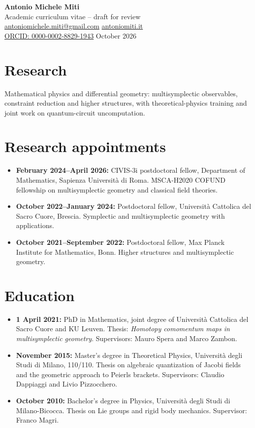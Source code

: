 \documentclass[11pt,a4paper]{article}
\newcommand{\AI}[1]{{\color{red}#1}}
\begin{document}
\begin{center}
{\LARGE\bfseries Antonio Michele Miti}\\[0.2em]
{\large Academic curriculum vitae -- draft for review}\\[0.3em]
\href{mailto:antoniomichele.miti@gmail.com}{antoniomichele.miti@gmail.com}\quad
\href{https://www.antoniomiti.it/}{antoniomiti.it}\\
\href{https://orcid.org/0000-0002-8829-1943}{ORCID: 0000-0002-8829-1943} October 2026
\end{center}
\section*{Research}
\AI{Mathematical physics and differential geometry: multisymplectic observables, constraint reduction and higher structures, with theoretical-physics training and joint work on quantum-circuit uncomputation.}
\section*{Research appointments}
\begin{itemize}
\item \textbf{February 2024--April 2026:} CIVIS-3i postdoctoral fellow, Department of Mathematics, Sapienza Universit\`a di Roma. MSCA-H2020 COFUND fellowship on multisymplectic geometry and classical field theories.
\item \textbf{October 2022--January 2024:} Postdoctoral fellow, Universit\`a Cattolica del Sacro Cuore, Brescia. Symplectic and multisymplectic geometry with applications.
\item \textbf{October 2021--September 2022:} Postdoctoral fellow, Max Planck Institute for Mathematics, Bonn. Higher structures and multisymplectic geometry.
\end{itemize}
\section*{Education}
\begin{itemize}
\item \textbf{1 April 2021:} PhD in Mathematics, joint degree of Universit\`a Cattolica del Sacro Cuore and KU Leuven. Thesis: \emph{Homotopy comomentum maps in multisymplectic geometry}. Supervisors: Mauro Spera and Marco Zambon.
\item \textbf{November 2015:} Master's degree in Theoretical Physics, Universit\`a degli Studi di Milano, 110/110. Thesis on algebraic quantization of Jacobi fields and the geometric approach to Peierls brackets. Supervisors: Claudio Dappiaggi and Livio Pizzocchero.
\item \textbf{October 2010:} Bachelor's degree in Physics, Universit\`a degli Studi di Milano-Bicocca. Thesis on Lie groups and rigid body mechanics. Supervisor: Franco Magri.
\end{itemize}
\end{document}
